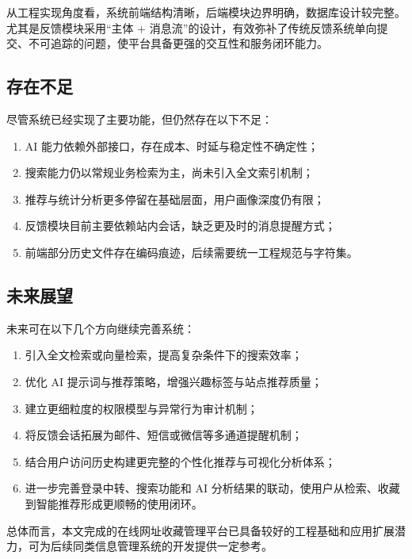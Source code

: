\documentclass[12pt,a4paper]{ctexart}
\begin{document}
从工程实现角度看，系统前端结构清晰，后端模块边界明确，数据库设计较完整。尤其是反馈模块采用“主体 + 消息流”的设计，有效弥补了传统反馈系统单向提交、不可追踪的问题，使平台具备更强的交互性和服务闭环能力。

\subsection{存在不足}
尽管系统已经实现了主要功能，但仍然存在以下不足：

\begin{enumerate}[label=\arabic.]
    \item AI 能力依赖外部接口，存在成本、时延与稳定性不确定性；
    \item 搜索能力仍以常规业务检索为主，尚未引入全文索引机制；
    \item 推荐与统计分析更多停留在基础层面，用户画像深度仍有限；
    \item 反馈模块目前主要依赖站内会话，缺乏更及时的消息提醒方式；
    \item 前端部分历史文件存在编码痕迹，后续需要统一工程规范与字符集。
\end{enumerate}

\subsection{未来展望}
未来可在以下几个方向继续完善系统：

\begin{enumerate}[label=\arabic.]
    \item 引入全文检索或向量检索，提高复杂条件下的搜索效率；
    \item 优化 AI 提示词与推荐策略，增强兴趣标签与站点推荐质量；
    \item 建立更细粒度的权限模型与异常行为审计机制；
    \item 将反馈会话拓展为邮件、短信或微信等多通道提醒机制；
    \item 结合用户访问历史构建更完整的个性化推荐与可视化分析体系；
    \item 进一步完善登录中转、搜索功能和 AI 分析结果的联动，使用户从检索、收藏到智能推荐形成更顺畅的使用闭环。
\end{enumerate}

总体而言，本文完成的在线网址收藏管理平台已具备较好的工程基础和应用扩展潜力，可为后续同类信息管理系统的开发提供一定参考。
\end{document}
